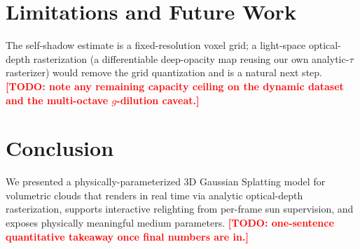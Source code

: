 \documentclass[sigconf]{acmart}
\newcommand{\todo}[1]{\textcolor{red}{\textbf{[TODO: #1]}}}
\begin{document}
\section{Limitations and Future Work}
\label{sec:limits}

The self-shadow estimate is a fixed-resolution voxel grid; a light-space
optical-depth rasterization (a differentiable deep-opacity map reusing our own
analytic-$\tau$ rasterizer) would remove the grid quantization and is a natural
next step. \todo{note any remaining capacity ceiling on the dynamic dataset and
the multi-octave $g$-dilution caveat.}

\section{Conclusion}
\label{sec:conclusion}

We presented a physically-parameterized 3D Gaussian Splatting model for
volumetric clouds that renders in real time via analytic optical-depth
rasterization, supports interactive relighting from per-frame sun supervision,
and exposes physically meaningful medium parameters. \todo{one-sentence
quantitative takeaway once final numbers are in.}



\end{document}

